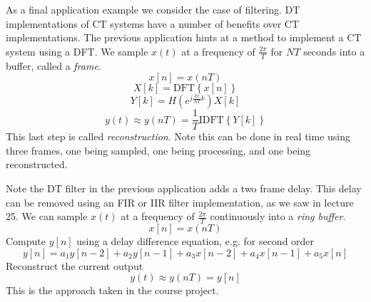 As a final application example we consider the case of filtering. DT implementations of CT systems have a number of benefits over CT implementations. The previous application hints at a method to implement a CT system using a DFT. We sample $x(t)$ at a frequency of $\frac{2\pi}{T}$ for $NT$ seconds into a buffer, called a \emph{frame}.
\[
x[n] = x(nT)
\]
\[
X[k] = \text{DFT}\left\{ x[n] \right\}
\]
\[
Y[k] = H\left(e^{j\frac{2\pi}{NT} k}\right) X[k]
\]
\[
y(t) \approx y(nT) = \frac{1}{T} \text{IDFT}\left\{ Y[k] \right\}
\]
This last step is called \emph{reconstruction}. Note this can be done in real time using three frames, one being sampled, one being processing, and one being reconstructed.

Note the DT filter in the previous application adds a two frame delay. This delay can be removed using an FIR or IIR filter implementation, as we saw in lecture 25. We can sample $x(t)$ at a frequency of $\frac{2\pi}{T}$ continuously into a \emph{ring buffer}.
\[
x[n] = x(nT)
\]
Compute $y[n]$ using a delay difference equation, e.g. for second order
\[
y[n] = a_1 y[n-2] + a_2 y[n-1] + a_3 x[n-2] + a_4 x[n-1] + a_5 x[n]
\]
Reconstruct the current output
\[
y(t) \approx y(nT) = y[n]
\]
This is the approach taken in the course project.
